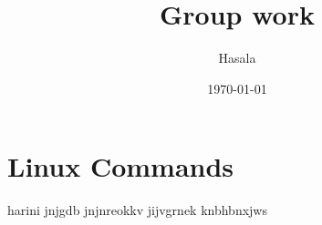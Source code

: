 \documentclass{article}
\title{Group work}
\date{\today}
\author{Hasala}
\begin{document}
\maketitle

\section{Linux Commands}

harini  jnjgdb jnjnreokkv jijvgrnek knbhbnxjws
\end{document}
